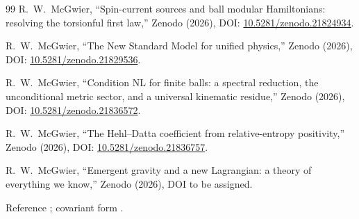 \documentclass[11pt]{article}
\theoremstyle{definition}
\begin{document}
\begin{thebibliography}{99}
R.~W.~McGwier, ``Spin-current sources and ball modular Hamiltonians:
resolving the torsionful first law,''
Zenodo (2026), DOI:
\href{https://doi.org/10.5281/zenodo.21824934}{10.5281/zenodo.21824934}.

R.~W.~McGwier, ``The New Standard Model for unified physics,''
Zenodo (2026), DOI:
\href{https://doi.org/10.5281/zenodo.21829536}{10.5281/zenodo.21829536}.

R.~W.~McGwier, ``Condition NL for finite balls: a spectral reduction, the unconditional metric sector, and a universal kinematic residue,''
Zenodo (2026), DOI:
\href{https://doi.org/10.5281/zenodo.21836572}{10.5281/zenodo.21836572}.

R.~W.~McGwier, ``The Hehl--Datta coefficient from relative-entropy positivity,''
Zenodo (2026), DOI:
\href{https://doi.org/10.5281/zenodo.21836757}{10.5281/zenodo.21836757}.

R.~W.~McGwier, ``Emergent gravity and a new Lagrangian: a theory of everything we know,''
Zenodo (2026), DOI to be assigned.

Reference \cite{RyuTakayanagi2006}; covariant form \cite{HRT2007}.

\end{thebibliography}
\end{document}
